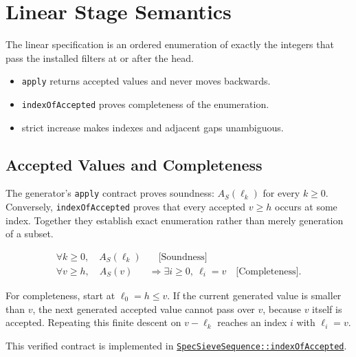 \section{Linear Stage Semantics}
\label{sec:linear-stage-semantics}

The linear specification is an ordered enumeration of exactly the
integers that pass the installed filters at or after the head.

\begin{itemize}
  \item \texttt{apply} returns accepted values and never moves backwards.
  \item \texttt{indexOfAccepted} proves completeness of the enumeration.
  \item strict increase makes indexes and adjacent gaps unambiguous.
\end{itemize}

\subsection{Accepted Values and Completeness}
\label{sec:accepted-values-completeness}

{\raggedright
The generator's \texttt{apply} contract proves soundness: $A_S(\ell_k)$
for every $k\ge0$. Conversely, \texttt{indexOfAccepted} proves that every
accepted $v\ge h$ occurs at some index. Together they establish exact
enumeration rather than merely generation of a subset.
\par}

\begin{equation*}
\begin{aligned}
\forall k\ge0,\quad
A_S(\ell_k)
&\quad\text{[Soundness]} \\
\forall v\ge h,\quad
A_S(v)
&\Longrightarrow
\exists i\ge0,\ \ell_i=v
\quad\text{[Completeness]}.
\end{aligned}
\end{equation*}

For completeness, start at $\ell_0=h\le v$. If the current generated
value is smaller than $v$, the next generated accepted value cannot pass
over $v$, because $v$ itself is accepted. Repeating this finite descent
on $v-\ell_k$ reaches an index $i$ with $\ell_i=v$.

This verified contract is implemented in
\href{https://github.com/thiagomata/prime-numbers/blob/master/src/main/scala/v1/chapter6/sieve/seq/spec/SpecSieveSequence.scala}{\texttt{SpecSieveSequence::indexOfAccepted}}.

